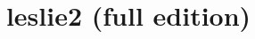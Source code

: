 \documentclass{report}
\title{leslie2 (full edition)}
\begin{document}
\maketitle
\noindent\textit{\buildstamp}

\end{document}
